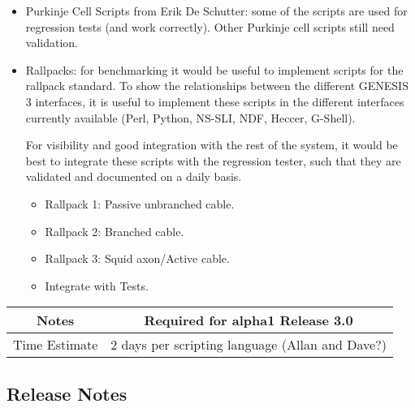 \documentclass[12pt]{article}
\begin{document}
\begin{itemize}
\item Purkinje Cell Scripts from Erik De Schutter: some of the scripts
  are used for regression tests (and work correctly).  Other Purkinje
  cell scripts still need validation.
\item Rallpacks: for benchmarking it would be useful to implement
  scripts for the rallpack standard.  To show the relationships
  between the different GENESIS\,3 interfaces, it is useful to
  implement these scripts in the different interfaces currently
  available (Perl, Python, NS-SLI, NDF, Heccer, G-Shell).

  For visibility and good integration with the rest of the system, it
  would be best to integrate these scripts with the regression tester,
  such that they are validated and documented on a daily basis.
  \begin{itemize}
  \item Rallpack 1: Passive unbranched cable.
  \item Rallpack 2: Branched cable.
  \item Rallpack 3: Squid axon/Active cable.
  \item Integrate with Tests.
  \end{itemize}
\end{itemize}

{
  \vspace{5mm}
  \centering
  \begin{tabular}{|c|c|}
    \hline
    Notes
    & Required for alpha1 Release 3.0 \\
    \hline
    Time Estimate
    & 2 days per scripting language (Allan and Dave?) \\
    \hline
  \end{tabular}
}


\subsection{Release Notes}
\end{document}
